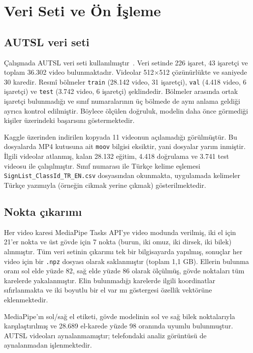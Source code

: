 \section{Veri Seti ve Ön İşleme}
\label{CH:Veri}

\subsection{AUTSL veri seti}

Çalışmada AUTSL veri seti kullanılmıştır~\cite{AUTSL2020}. Veri setinde 226 işaret,
43 işaretçi ve toplam 36.302 video bulunmaktadır. Videolar 512$\times$512 çözünürlükte
ve saniyede 30 karedir. Resmî bölmeler \texttt{train} (28.142 video, 31 işaretçi),
\texttt{val} (4.418 video, 6 işaretçi) ve \texttt{test} (3.742 video, 6 işaretçi)
şeklindedir. Bölmeler arasında ortak işaretçi bulunmadığı ve sınıf numaralarının üç
bölmede de aynı anlama geldiği ayrıca kontrol edilmiştir. Böylece ölçülen doğruluk,
modelin daha önce görmediği kişiler üzerindeki başarısını göstermektedir.

Kaggle üzerinden indirilen kopyada 11 videonun açılamadığı görülmüştür. Bu dosyalarda
MP4 kutusuna ait \texttt{moov} bilgisi eksiktir, yani dosyalar yarım inmiştir. İlgili
videolar atlanmış, kalan 28.132 eğitim, 4.418 doğrulama ve 3.741 test videosu ile
çalışılmıştır. Sınıf numarası ile Türkçe kelime eşlemesi
\texttt{SignList\_ClassId\_TR\_EN.csv} dosyasından okunmakta, uygulamada kelimeler
Türkçe yazımıyla (örneğin \sol cikmak\sag{} yerine \sol çıkmak\sag) gösterilmektedir.

\subsection{Nokta çıkarımı}

Her video karesi MediaPipe Tasks API'ye video modunda verilmiş, iki el için 21'er nokta
ve üst gövde için 7 nokta (burun, iki omuz, iki dirsek, iki bilek) alınmıştır. Tüm veri
setinin çıkarımı tek bir bilgisayarda yapılmış, sonuçlar her video için bir
\texttt{.npz} dosyası olarak saklanmıştır (toplam 1,1 GB). Ellerin bulunma oranı sol
elde yüzde 82, sağ elde yüzde 86 olarak ölçülmüş, gövde noktaları tüm karelerde
yakalanmıştır. Elin bulunmadığı karelerde ilgili koordinatlar sıfırlanmakta ve iki
boyutlu bir \sol el var mı\sag{} göstergesi özellik vektörüne eklenmektedir.

MediaPipe'ın sol/sağ el etiketi, gövde modelinin sol ve sağ bilek noktalarıyla
karşılaştırılmış ve 28.689 el-karede yüzde 98 oranında uyumlu bulunmuştur. AUTSL
videoları aynalanmamıştır; telefondaki analiz görüntüsü de aynalanmadan işlenmektedir.

